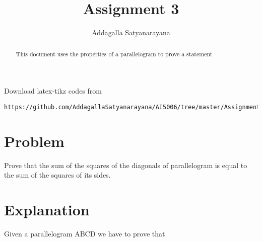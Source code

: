 \documentclass[journal,12pt,twocolumn]{IEEEtran}
\begin{document}
	\makeatother
	\let\StandardTheFigure\thefigure
	\let\vec\mathbf
	\renewcommand{\thefigure}{\theproblem}
	\def\putbox#1#2#3{\makebox[0in][l]{\makebox[#1][l]{}\raisebox{\baselineskip}[0in][0in]{\raisebox{#2}[0in][0in]{#3}}}}
	\def\rightbox#1{\makebox[0in][r]{#1}}
	\def\centbox#1{\makebox[0in]{#1}}
	\def\topbox#1{\raisebox{-\baselineskip}[0in][0in]{#1}}
	\def\midbox#1{\raisebox{-0.5\baselineskip}[0in][0in]{#1}}
	\vspace{3cm}
	\title{Assignment 3}
	\author{Addagalla Satyanarayana}
	\maketitle
	\newpage
	\bigskip
	\renewcommand{\thefigure}{\theenumi}
	\renewcommand{\thetable}{\theenumi}
\begin{abstract}
This document uses the properties of a parallelogram to prove a statement
\end{abstract}
Download latex-tikz codes from 
%
\begin{lstlisting}
https://github.com/AddagallaSatyanarayana/AI5006/tree/master/Assignment3/assignment3.tex
\end{lstlisting}
%
\section{Problem}
	Prove that the sum of the squares of the diagonals of parallelogram is equal to the sum of the squares of its sides.


\section{Explanation}
Given a parallelogram ABCD we have to prove that
	
\end{document}
